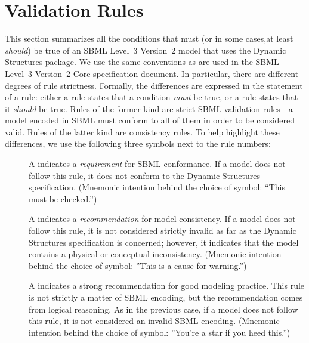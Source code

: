 \newcommand{\printValid}{\validRule{arrays-\arabic{arraysCtr}\addtocounter{arraysCtr}{1}}}
\section{Validation Rules}
\label{validation}

This section summarizes all the conditions that must (or in some cases,at least \emph{should}) be true of an SBML Level~3 Version~2 model that uses the Dynamic Structures package. We use the same conventions as are used in the SBML Level~3 Version~2 Core specification document.  In particular, there are different degrees of rule strictness. Formally, the differences are expressed in the statement of a rule: either a rule states that a condition \emph{must} be true, or a rule states that it \emph{should} be true. Rules of the former kind are strict SBML validation rules---a model encoded in SBML must conform to all of them in order to be considered valid.  Rules of the latter kind are consistency rules. To help highlight these differences, we use the following three symbols next to the rule numbers:

\begin{description}

\item[\hspace*{6.5pt}\vSymbol\vsp] A \vSymbolName indicates a
  \emph{requirement} for SBML conformance. If a model does not follow
  this rule, it does not conform to the Dynamic Structures
  specification.  (Mnemonic intention behind the choice of symbol:
  ``This must be checked.'')

\item[\hspace*{6.5pt}\cSymbol\csp] A \cSymbolName indicates a
  \emph{recommendation} for model consistency.  If a model does not
  follow this rule, it is not considered strictly invalid as far as the
  Dynamic Structures specification is concerned; however, it
  indicates that the model contains a physical or conceptual
  inconsistency.  (Mnemonic intention behind the choice of symbol:
  ''This is a cause for warning.'')

\item[\hspace*{6.5pt}\mSymbol\msp] A \mSymbolName indicates a strong
  recommendation for good modeling practice.  This rule is not strictly
  a matter of SBML encoding, but the recommendation comes from logical
  reasoning.  As in the previous case, if a model does not follow this
  rule, it is not considered an invalid SBML encoding.  (Mnemonic
  intention behind the choice of symbol: ''You're a star if you heed
  this.'')
\end{description}

